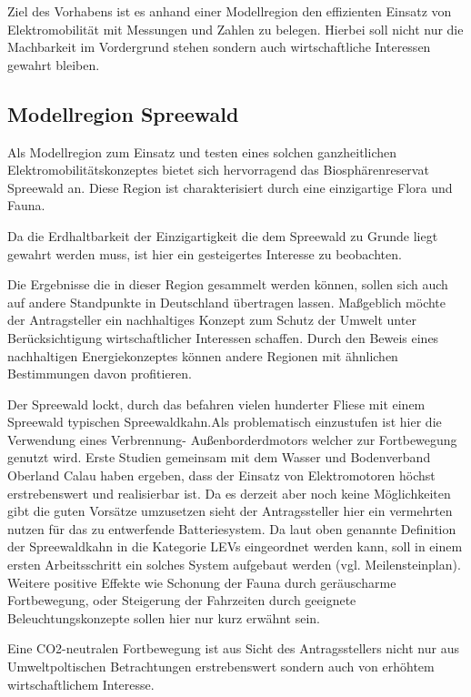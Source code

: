 Ziel des Vorhabens ist es anhand einer Modellregion den effizienten Einsatz von Elektromobilität mit Messungen und Zahlen zu belegen. Hierbei soll nicht nur die Machbarkeit im Vordergrund stehen sondern auch wirtschaftliche Interessen gewahrt bleiben.

\subsection{Modellregion Spreewald}


Als Modellregion zum Einsatz und testen eines solchen ganzheitlichen Elektromobilitätskonzeptes bietet sich hervorragend das Biosphärenreservat Spreewald an. 
Diese Region ist charakterisiert durch eine einzigartige Flora und Fauna.%

Da die Erdhaltbarkeit der Einzigartigkeit die dem  Spreewald zu Grunde liegt gewahrt werden muss, ist hier ein gesteigertes Interesse zu beobachten. 

Die Ergebnisse die in dieser Region gesammelt werden können, sollen sich auch auf andere Standpunkte in Deutschland übertragen lassen. Maßgeblich möchte der Antragsteller ein nachhaltiges Konzept zum Schutz der Umwelt unter Berücksichtigung wirtschaftlicher Interessen schaffen. 
Durch den Beweis eines nachhaltigen Energiekonzeptes können andere Regionen mit ähnlichen Bestimmungen davon profitieren.

Der Spreewald lockt, durch das befahren vielen hunderter Fliese mit einem Spreewald typischen Spreewaldkahn.Als  problematisch einzustufen ist hier die Verwendung eines Verbrennung- Außenborderdmotors welcher zur Fortbewegung genutzt wird. Erste Studien gemeinsam mit dem Wasser und Bodenverband Oberland Calau haben ergeben, dass der Einsatz von Elektromotoren höchst erstrebenswert und realisierbar ist. Da es derzeit aber noch keine Möglichkeiten gibt die guten Vorsätze umzusetzen sieht der Antragssteller hier ein vermehrten nutzen für das zu entwerfende Batteriesystem.
Da laut oben genannte Definition der Spreewaldkahn in die Kategorie LEVs eingeordnet werden kann, soll in einem ersten Arbeitsschritt ein solches System aufgebaut werden (vgl. Meilensteinplan).
Weitere positive Effekte wie Schonung der Fauna durch geräuscharme Fortbewegung, oder Steigerung der Fahrzeiten durch geeignete Beleuchtungskonzepte sollen hier nur kurz erwähnt sein.

Eine CO2-neutralen Fortbewegung ist aus Sicht des Antragsstellers nicht nur aus Umweltpoltischen Betrachtungen erstrebenswert sondern auch von erhöhtem wirtschaftlichem Interesse. 

